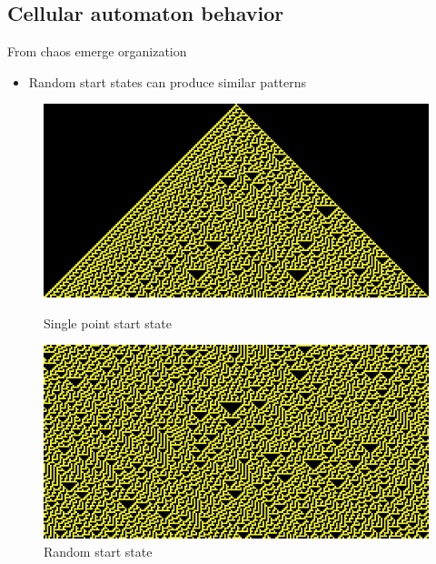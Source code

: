 \documentclass{beamer}
\begin{document}
\subsection{Cellular automaton behavior}
\begin{frame}{From chaos emerge organization}
\begin{itemize}
  \item Random start states can produce similar patterns
\end{itemize}

  \begin{figure}[ht]
	  \begin{minipage}[b]{0.45\linewidth}
	    \centering
	    \includegraphics[width=\textwidth]{images/single_start.png}
		  \caption{\scriptsize Single point start state}
    \end{minipage}
    \hspace{0.5cm}
    \begin{minipage}[b]{0.45\linewidth}
	    \centering
	    \includegraphics[width=\textwidth]{images/rand_start.png}
	    \caption{\scriptsize Random start state}
    \end{minipage}
  \end{figure}
\end{frame}
\end{document}
